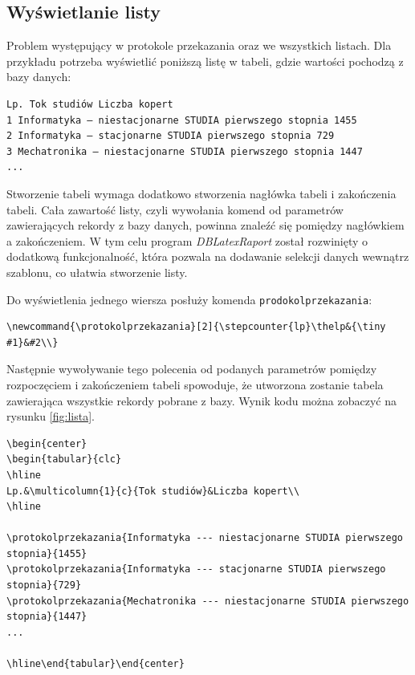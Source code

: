  \subsection{Wyświetlanie listy}
Problem występujący w protokole przekazania oraz we wszystkich listach. Dla przykładu potrzeba wyświetlić poniższą listę w tabeli, gdzie wartości pochodzą z bazy danych:
\begin{lstlisting}
Lp. Tok studiów Liczba kopert
1 Informatyka — niestacjonarne STUDIA pierwszego stopnia 1455
2 Informatyka — stacjonarne STUDIA pierwszego stopnia 729
3 Mechatronika — niestacjonarne STUDIA pierwszego stopnia 1447
...
\end{lstlisting}
\vspace{5mm}
\par
Stworzenie tabeli wymaga dodatkowo stworzenia nagłówka tabeli i zakończenia tabeli. Cała zawartość listy, czyli wywołania komend  od parametrów zawierających rekordy z bazy danych, powinna znaleźć się pomiędzy nagłówkiem a zakończeniem. W tym celu program \emph{DBLatexRaport} został rozwinięty o dodatkową funkcjonalność, która pozwala na dodawanie selekcji danych wewnątrz szablonu, co ułatwia stworzenie listy. 
\par
Do wyświetlenia jednego wiersza posłuży komenda \texttt{prodokolprzekazania}:
\vspace{5mm}
\begin{lstlisting}
\newcommand{\protokolprzekazania}[2]{\stepcounter{lp}\thelp&{\tiny #1}&#2\\}
\end{lstlisting}
\vspace{3mm}
\par
Następnie wywoływanie tego polecenia od podanych parametrów pomiędzy rozpoczęciem i zakończeniem tabeli spowoduje, że utworzona zostanie tabela zawierająca wszystkie rekordy pobrane z bazy. Wynik kodu można zobaczyć na rysunku \ref{fig:lista}.
\begin{lstlisting}
\begin{center}
\begin{tabular}{clc}
\hline
Lp.&\multicolumn{1}{c}{Tok studiów}&Liczba kopert\\
\hline

\protokolprzekazania{Informatyka --- niestacjonarne STUDIA pierwszego stopnia}{1455}
\protokolprzekazania{Informatyka --- stacjonarne STUDIA pierwszego stopnia}{729}
\protokolprzekazania{Mechatronika --- niestacjonarne STUDIA pierwszego stopnia}{1447}
...

\hline\end{tabular}\end{center}
\end{lstlisting}

